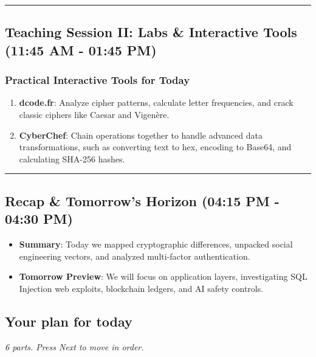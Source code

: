 \documentclass[12pt,openany]{book}
\begin{document}
\medskip\noindent\rule{\linewidth}{0.4pt}\medskip

\medskip

\subsection*{Teaching Session II: Labs \& Interactive Tools (11:45 AM - 01:45 PM)}


\subsubsection*{Practical Interactive Tools for Today}


\begin{enumerate}

  \item \textbf{dcode.fr}: Analyze cipher patterns, calculate letter frequencies, and crack classic ciphers like Caesar and Vigenère.

  \item \textbf{CyberChef}: Chain operations together to handle advanced data transformations, such as converting text to hex, encoding to Base64, and calculating SHA-256 hashes.

\end{enumerate}


\medskip\noindent\rule{\linewidth}{0.4pt}\medskip

\medskip

\subsection*{Recap \& Tomorrow's Horizon (04:15 PM - 04:30 PM)}


\begin{itemize}

  \item \textbf{Summary}: Today we mapped cryptographic differences, unpacked social engineering vectors, and analyzed multi-factor authentication.

  \item \textbf{Tomorrow Preview}: We will focus on application layers, investigating SQL Injection web exploits, blockchain ledgers, and AI safety controls.

\end{itemize}

\medskip

\subsection*{Your plan for today}
{\small\itshape\color{gray}6 parts. Press Next to move in order.}
\end{document}
